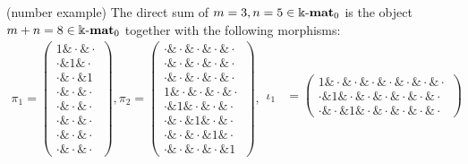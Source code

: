 \begin{example}{(number example)}
The direct sum of $m = 3, n = 5 \in \Bbbk\textnormal{-}\mathbf{mat}_{0}$ is the object $m+n = 8 \in \Bbbk\textnormal{-}\mathbf{mat}_{0}$ together with the following morphisms:
\begin{align*}
\pi_{1} = \begin{pmatrix}
1 \ampersand \cdot \ampersand \cdot \\
\cdot \ampersand 1 \ampersand \cdot \\
\cdot \ampersand \cdot \ampersand 1 \\
\cdot \ampersand \cdot \ampersand \cdot \\
\cdot \ampersand \cdot \ampersand \cdot \\
\cdot \ampersand \cdot \ampersand \cdot \\
\cdot \ampersand \cdot \ampersand \cdot \\
\cdot \ampersand \cdot \ampersand \cdot
\end{pmatrix},
\pi_{2} = \begin{pmatrix}
\cdot \ampersand \cdot \ampersand \cdot \ampersand \cdot \ampersand \cdot \\
\cdot \ampersand \cdot \ampersand \cdot \ampersand \cdot \ampersand \cdot \\
\cdot \ampersand \cdot \ampersand \cdot \ampersand \cdot \ampersand \cdot \\
1 \ampersand \cdot \ampersand \cdot \ampersand \cdot \ampersand \cdot \\
\cdot \ampersand 1 \ampersand \cdot \ampersand \cdot \ampersand \cdot \\
\cdot \ampersand \cdot \ampersand 1 \ampersand \cdot \ampersand \cdot \\
\cdot \ampersand \cdot \ampersand \cdot \ampersand 1 \ampersand \cdot \\
\cdot \ampersand \cdot \ampersand \cdot \ampersand \cdot \ampersand 1
\end{pmatrix}, 
\begin{array}{rr}
\iota_{1} &= \begin{pmatrix}
1 \ampersand \cdot \ampersand \cdot \ampersand \cdot \ampersand \cdot \ampersand \cdot \ampersand \cdot \ampersand \cdot \\
\cdot \ampersand 1 \ampersand \cdot \ampersand \cdot \ampersand \cdot \ampersand \cdot \ampersand \cdot \ampersand \cdot \\
\cdot \ampersand \cdot \ampersand 1 \ampersand \cdot \ampersand \cdot \ampersand \cdot \ampersand \cdot \ampersand \cdot
\end{pmatrix} \\

\end{array}
\end{align*}
\end{example}
